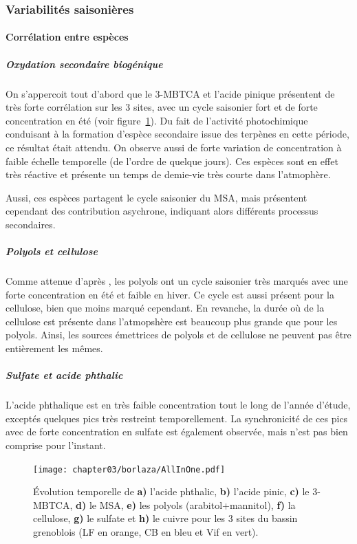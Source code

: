 \subsubsection{Variabilités saisonières}%
\label{ssub:variabilites_saisonières}

\paragraph{Corrélation entre espèces}%
\label{par:correlation_entre_especes}

\subparagraph{Oxydation secondaire biogénique}%
\label{par:oxydation_secondaire_biogénique}

On s'appercoit tout d'abord que le 3-MBTCA et l'acide pinique présentent de très forte
corrélation sur les 3 sites, avec un cycle saisonier fort et de forte concentration en été
(voir figure~\ref{fig:borlaza_evolution_temporelle}). Du fait de l'activité photochimique
conduisant à la formation d'espèce secondaire issue des terpènes en cette période, ce
résultat était attendu. On observe aussi de forte variation de concentration à faible
échelle temporelle (de l'ordre de quelque jours). Ces espèces sont en effet très réactive
et présente un temps de demie-vie très courte dans l'atmophère.

Aussi, ces espèces partagent le cycle saisonier du MSA, mais présentent cependant des
contribution asychrone, indiquant alors différents processus secondaires.

\subparagraph{Polyols et cellulose}%
\label{par:oxydation_secondaire_anthrophique}

Comme attenue d'après \cite{samakePolyols2019}, les polyols ont un cycle saisonier très
marqués avec une forte concentration en été et faible en hiver. Ce cycle est aussi présent
pour la cellulose, bien que moins marqué cependant. En revanche, la durée où de la
cellulose est présente dans l'atmopshère est beaucoup plus grande que pour les polyols.
Ainsi, les sources émettrices de polyols et de cellulose ne peuvent pas être entièrement
les mêmes.

\subparagraph{Sulfate et acide phthalic}%
\label{par:sulfate_et_acide_phthalic}

L'acide phthalique est en très faible concentration tout le long de l'année d'étude,
exceptés quelques pics très restreint temporellement. La synchronicité de ces pics avec de
forte concentration en sulfate est également observée, mais n'est pas bien comprise pour
l'instant.


\begin{figure}[ht]
    \centering
    \texttt{[image: chapter03/borlaza/AllInOne.pdf]}
    \caption{
        Évolution temporelle de \textbf{a)} l'acide phthalic, \textbf{b)} l'acide pinic,
        \textbf{c)} le 3-MBTCA, \textbf{d)} le MSA, \textbf{e)} les polyols
        (arabitol+mannitol), \textbf{f)} la cellulose, \textbf{g)} le sulfate et
        \textbf{h)} le cuivre pour les 3 sites du bassin grenoblois (LF en orange, CB en
        bleu et Vif en vert).
    }%
    \label{fig:borlaza_evolution_temporelle}
\end{figure}

